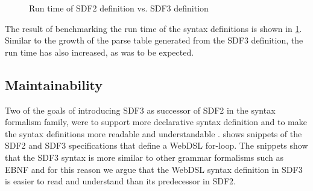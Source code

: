     \begin{figure}
      \parsingbenchmarkresults
      \caption{\label{fig:syntax-performance-charts}Run time of SDF2 definition vs. SDF3 definition}
    \end{figure}

    The result of benchmarking the run time of the syntax definitions is shown in \cref{fig:syntax-performance-charts}. Similar to the growth of the parse table generated from the SDF3 definition, the run time has also increased, as was to be expected.

  \subsection{Maintainability}

    Two of the goals of introducing SDF3 as successor of SDF2 in the syntax formalism family, were to support more declarative syntax definition and to make the syntax definitions more readable and understandable \autocite{AmorimV20}.  shows snippets of the SDF2 and SDF3 specifications that define a WebDSL for-loop. The snippets show that the SDF3 syntax is more similar to other grammar formalisms such as EBNF \autocite{BackusBGK0NPRSV63} and for this reason we argue that the WebDSL syntax definition in SDF3 is easier to read and understand than its predecessor in SDF2.


